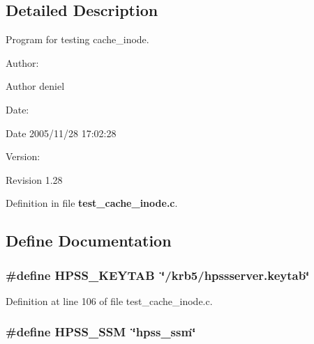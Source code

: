 \subsection{Detailed Description}
Program for testing cache\_\-inode. 

\begin{Desc}
\item[Author:]\end{Desc}
\begin{Desc}
\item[Author]deniel \end{Desc}
\begin{Desc}
\item[Date:]\end{Desc}
\begin{Desc}
\item[Date]2005/11/28 17:02:28 \end{Desc}
\begin{Desc}
\item[Version:]\end{Desc}
\begin{Desc}
\item[Revision]1.28 \end{Desc}


Definition in file {\bf test\_\-cache\_\-inode.c}.

\subsection{Define Documentation}
\subsubsection[{HPSS\_\-KEYTAB}]{\setlength{\rightskip}{0pt plus 5cm}\#define HPSS\_\-KEYTAB~\char`\"{}/krb5/hpssserver.keytab\char`\"{}}\label{test__cache__inode_8c_547201ff2674f71edbe3ba4ec6296d93}




Definition at line 106 of file test\_\-cache\_\-inode.c.
\subsubsection[{HPSS\_\-SSM}]{\setlength{\rightskip}{0pt plus 5cm}\#define HPSS\_\-SSM~\char`\"{}hpss\_\-ssm\char`\"{}}\label{test__cache__inode_8c_863b7cbf4c49b9bdda01992b993130a2}




